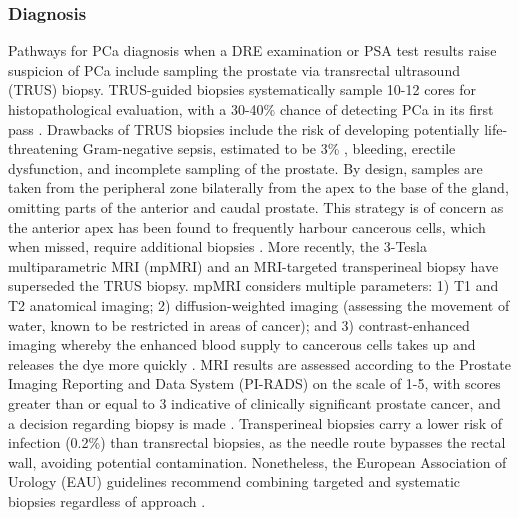 \subsubsection{Diagnosis}
Pathways for PCa diagnosis when a DRE examination or PSA test results raise suspicion of PCa include sampling the prostate via transrectal ultrasound (TRUS) biopsy. TRUS-guided biopsies systematically sample 10-12 cores for histopathological evaluation, with a 30-40\% chance of detecting PCa in its first pass \cite{Ploussard2014Jan}. Drawbacks of TRUS biopsies include the risk of developing potentially life-threatening Gram-negative sepsis, estimated to be 3\% \cite{Loeb2013Dec}, bleeding, erectile dysfunction, and incomplete sampling of the prostate. By design, samples are taken from the peripheral zone bilaterally from the apex to the base of the gland, omitting parts of the anterior and caudal prostate. This strategy is of concern as the anterior apex has been found to frequently harbour cancerous cells, which when missed, require additional biopsies \cite{Moussa2010May}. More recently, the 3-Tesla multiparametric MRI (mpMRI) and an MRI-targeted transperineal biopsy have superseded the TRUS biopsy. mpMRI considers multiple parameters: 1) T1 and T2 anatomical imaging; 2) diffusion-weighted imaging (assessing the movement of water, known to be restricted in areas of cancer); and 3) contrast-enhanced imaging whereby the enhanced blood supply to cancerous cells takes up and releases the dye more quickly \cite{Moore2013Jan}. MRI results are assessed according to the Prostate Imaging Reporting and Data System (PI-RADS) on the scale of 1-5, with scores greater than or equal to 3 indicative of clinically significant prostate cancer, and a decision regarding biopsy is made \cite{Klotz2021Apr}. Transperineal biopsies carry a lower risk of infection (0.2\%) than transrectal biopsies, as the needle route bypasses the rectal wall, avoiding potential contamination. Nonetheless, the European Association of Urology (EAU) guidelines recommend combining targeted and systematic biopsies regardless of approach \cite{Chernysheva2026Sep}.

